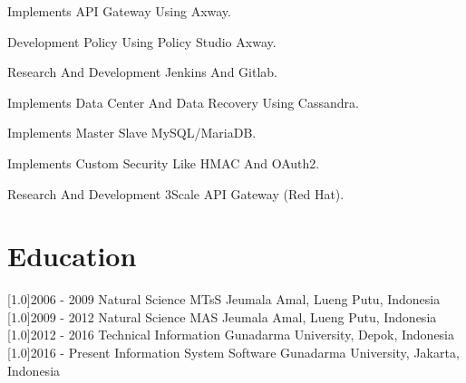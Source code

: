 \documentclass[english]{cv-style}
\begin{document}
\begin{entrylist}
{\begin{itemize}
{    \item Implements API Gateway Using Axway.
    \item Development Policy Using Policy Studio Axway.
    \item Research And Development Jenkins And Gitlab.
    \item Implements Data Center And Data Recovery Using Cassandra.
    \item Implements Master Slave MySQL/MariaDB.
    \item Implements Custom Security Like HMAC And OAuth2.
    \item Research And Development 3Scale API Gateway (Red Hat).}
  \end{itemize}}
\end{entrylist}
\section{Education}
  \vspace{-0.3cm}
\begin{entrylist}
\entry
{\scalebox{.8}[1.0]{2006 - 2009}}
{Natural Science}
{MTsS Jeumala Amal, Lueng Putu, Indonesia}
{}
\entry
{\scalebox{.8}[1.0]{2009 - 2012}}
{Natural Science}
{MAS Jeumala Amal, Lueng Putu, Indonesia}
{}
\entry
{\scalebox{.8}[1.0]{2012 - 2016}}
{Technical Information}
{Gunadarma University, Depok, Indonesia}
{}
\entry
{\scalebox{.8}[1.0]{2016 - Present}}
{Information System Software}
{Gunadarma University, Jakarta, Indonesia}
{}
\end{entrylist}
\vspace{-0.3cm}
\end{document}
